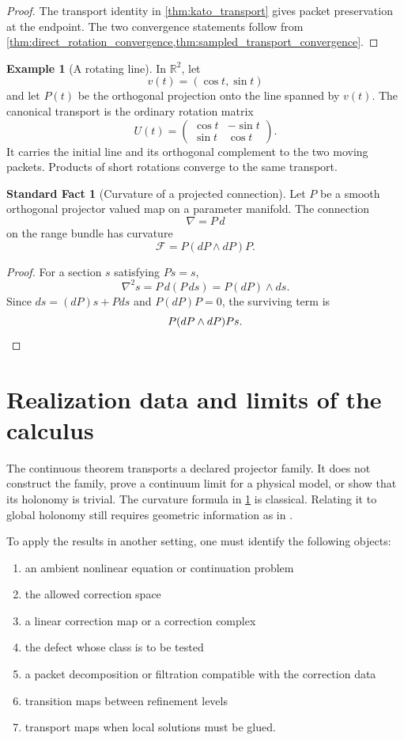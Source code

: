 \documentclass[11pt,a4paper]{article}
\theoremstyle{plain}
\theoremstyle{definition}
\newtheorem{example}[example]{Example}
\newtheorem{standardfact}[standardfact]{Standard Fact}
\theoremstyle{remark}
\newcommand{\Fcal}{\mathcal F}
\begin{document}
\begin{proof}
The transport identity in \cref{thm:kato_transport} gives packet preservation at the endpoint.  The two convergence statements follow from \cref{thm:direct_rotation_convergence,thm:sampled_transport_convergence}.
\end{proof}

\begin{example}[A rotating line]\label{ex:rotating_line}
In $\mathbb R^2$, let
\[
v(t)=(\cos t,\sin t)
\]
and let $P(t)$ be the orthogonal projection onto the line spanned by $v(t)$.  The canonical transport is the ordinary rotation matrix
\[
U(t)=
\begin{pmatrix}
\cos t&-\sin t\\
\sin t&\cos t
\end{pmatrix}.
\]
It carries the initial line and its orthogonal complement to the two moving packets.  Products of short rotations converge to the same transport.
\end{example}


\begin{standardfact}[Curvature of a projected connection]\label{fact:projected_curvature}
Let $P$ be a smooth orthogonal projector valued map on a parameter manifold.  The connection
\[
\nabla=P\,d
\]
on the range bundle has curvature
\[
\Fcal=P(dP\wedge dP)P.
\]
\end{standardfact}

\begin{proof}
For a section $s$ satisfying $Ps=s$,
\[
\nabla^2s=P\,d(P\,ds)=P(dP)\wedge ds.
\]
Since $ds=(dP)s+Pds$ and $P(dP)P=0$, the surviving term is
\[
P(dP\wedge dP)Ps.\qedhere
\]
\end{proof}

\section{Realization data and limits of the calculus}\label{sec:scope}

The continuous theorem transports a declared projector family.  It does not construct the family, prove a continuum limit for a physical model, or show that its holonomy is trivial.  The curvature formula in \cref{fact:projected_curvature} is classical.  Relating it to global holonomy still requires geometric information as in \cite{Kato1950,Kato1995,KobayashiNomizu1963}.

To apply the results in another setting, one must identify the following objects:
\begin{enumerate}
\item an ambient nonlinear equation or continuation problem
\item the allowed correction space
\item a linear correction map or a correction complex
\item the defect whose class is to be tested
\item a packet decomposition or filtration compatible with the correction data
\item transition maps between refinement levels
\item transport maps when local solutions must be glued.
\end{enumerate}
\end{document}
